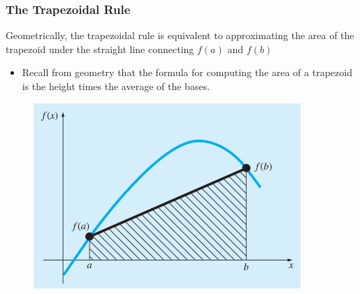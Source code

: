 \documentclass{if-beamer}
\begin{document}
\begin{frame}
	\frametitle{The Trapezoidal Rule}
	Geometrically, the trapezoidal rule is equivalent to approximating the area of the trapezoid under the straight line connecting $f(a)$ and $f(b)$\\\vspace{10pt}
	\begin{minipage}{0.5\textwidth}
		\begin{itemize}
			\item  Recall from geometry
			that the formula for computing the area of a trapezoid is the height times the average of the
			bases. 
		\end{itemize}
	\end{minipage}
	\begin{minipage}{0.5\textwidth}
	\begin{figure}
		\centering
		\includegraphics[width=0.9\textwidth]{figures/traprule}
	\end{figure}
    \end{minipage}
\end{frame}
\end{document}
